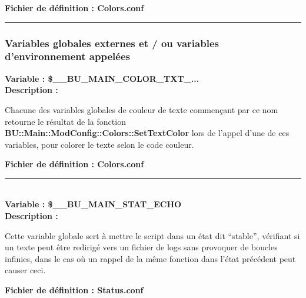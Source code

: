 \documentclass[a4paper,10pt]{article}
\begin{document}
\textbf{Fichier de définition : \color{lime}Colors.conf}\\[1\baselineskip]



\color{blue}\par\noindent\rule{\textwidth}{0.4pt}\color{white}

\color{blue}
\subsubsection{Variables globales externes et / ou variables d'environnement appelées}\color{white}

\textbf{Variable : \color{orange}\$\_\_BU\_MAIN\_COLOR\_TXT\_...}\\[1\baselineskip]

\textbf{Description :}

\begin{justify}
    Chacune des variables globales de couleur de texte commençant par ce nom retourne le résultat de la fonction \textbf{\color{mauve}BU::Main::ModConfig::Colors::SetTextColor} lors de l'appel d'une de ces variables, pour colorer le texte selon le code couleur.
\end{justify}

\textbf{Fichier de définition : \color{lime}Colors.conf}\\[1\baselineskip]



\color{orange}\par\noindent\rule{\textwidth}{0.4pt}\color{white}\\[1\baselineskip]

\textbf{Variable : \color{orange}\$\_\_BU\_MAIN\_STAT\_ECHO}\\[1\baselineskip]

\textbf{Description :}

\begin{justify}
    Cette variable globale sert à mettre le script dans un état dit ``stable'', vérifiant si un texte peut être redirigé vers un fichier de logs sans provoquer de boucles infinies, dans le cas où un rappel de la même fonction dans l'état précédent peut causer ceci.
\end{justify}

\textbf{Fichier de définition : \color{lime}Status.conf}\\[1\baselineskip]


\end{document}
